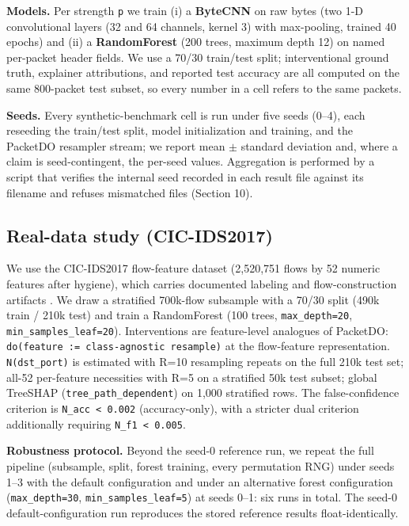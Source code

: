 \documentclass[journal]{IEEEtran}
\begin{document}
\textbf{Models.} Per strength \texttt{p} we train (i) a \textbf{ByteCNN}
on raw bytes (two 1-D convolutional layers (32 and 64 channels, kernel
3) with max-pooling, trained 40 epochs) and (ii) a \textbf{RandomForest}
(200 trees, maximum depth 12) on named per-packet header fields. We use
a 70/30 train/test split; interventional ground truth, explainer
attributions, and reported test accuracy are all computed on the same
800-packet test subset, so every number in a cell refers to the same
packets.

\textbf{Seeds.} Every synthetic-benchmark cell is run under five seeds
(0--4), each reseeding the train/test split, model initialization and
training, and the PacketDO resampler stream; we report mean $\pm$ standard
deviation and, where a claim is seed-contingent, the per-seed values.
Aggregation is performed by a script that verifies the internal seed
recorded in each result file against its filename and refuses mismatched
files (Section 10).

\subsection{Real-data study (CIC-IDS2017)}

We use the CIC-IDS2017 flow-feature dataset \cite{sharafaldin2018cicids}
(2,520,751 flows by 52 numeric features after hygiene), which carries
documented labeling and flow-construction artifacts
\cite{engelen2021troubleshooting,lanvin2022errors}. We draw a stratified
700k-flow subsample with a 70/30 split (490k train / 210k test) and
train a RandomForest (100 trees, \texttt{max\_depth=20},
\texttt{min\_samples\_leaf=20}). Interventions are feature-level
analogues of PacketDO:
\texttt{do(feature\ :=\ class-agnostic\ resample)} at the flow-feature
representation. \texttt{N(dst\_port)} is estimated with R=10 resampling
repeats on the full 210k test set; all-52 per-feature necessities with
R=5 on a stratified 50k test subset; global TreeSHAP
(\texttt{tree\_path\_dependent}) on 1,000 stratified rows. The
false-confidence criterion is \texttt{N\_acc\ \textless{}\ 0.002}
(accuracy-only), with a stricter dual criterion additionally requiring
\texttt{N\_f1\ \textless{}\ 0.005}.

\textbf{Robustness protocol.} Beyond the seed-0 reference run, we repeat
the full pipeline (subsample, split, forest training, every permutation
RNG) under seeds 1--3 with the default configuration and under an
alternative forest configuration (\texttt{max\_depth=30},
\texttt{min\_samples\_leaf=5}) at seeds 0--1: six runs in total. The
seed-0 default-configuration run reproduces the stored reference results
float-identically.
\end{document}
